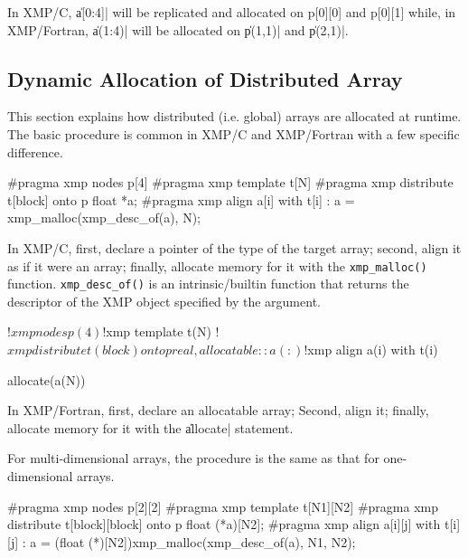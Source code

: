In XMP/C, \|a[0:4]| will be replicated and allocated on p[0][0] and
p[0][1] while, in XMP/Fortran, \|a(1:4)| will be allocated on \|p(1,1)|
and \|p(2,1)|.




\subsection{Dynamic Allocation of Distributed Array}

This section explains how distributed (i.e. global) arrays are allocated
at runtime. The basic procedure is common in XMP/C and XMP/Fortran with
a few specific difference.


\begin{XCexample}
#pragma xmp nodes p[4]
#pragma xmp template t[N]
#pragma xmp distribute t[block] onto p
float *a;
#pragma xmp align a[i] with t[i]
  :
a = xmp_malloc(xmp_desc_of(a), N);
\end{XCexample}

In XMP/C, first, declare a pointer of the type of the target array; 
%
second, align it as if it were an array;
%
finally, allocate memory for it with the {\tt xmp\_malloc()}
function. {\tt xmp\_desc\_of()} is an 
intrinsic/builtin function that returns the descriptor of the XMP object
specified by the argument.

\begin{XFexample}
!$xmp nodes p(4)
!$xmp template t(N)
!$xmp distribute t(block) onto p
real, allocatable :: a(:)
!$xmp align a(i) with t(i)

allocate(a(N))
\end{XFexample}

In XMP/Fortran, first, declare an allocatable array; Second, align it;
finally, allocate memory for it with the \|allocate| statement.


For multi-dimensional arrays, the procedure is the same as that for 
one-dimensional arrays.

\begin{XCexample}
#pragma xmp nodes p[2][2]
#pragma xmp template t[N1][N2]
#pragma xmp distribute t[block][block] onto p
float (*a)[N2];
#pragma xmp align a[i][j] with t[i][j]
  :
a = (float (*)[N2])xmp_malloc(xmp_desc_of(a), N1, N2);
\end{XCexample}

